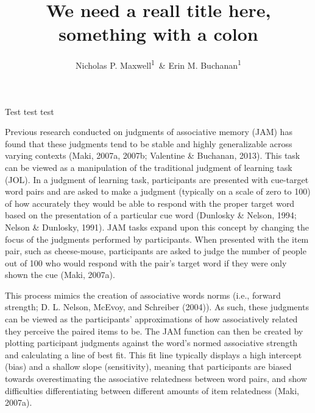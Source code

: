 \documentclass[english,man]{apa6}
\title{We need a reall title here, something with a colon}
\author{Nicholas P. Maxwell\textsuperscript{1}~\& Erin M. Buchanan\textsuperscript{1}}
\affiliation{
    \vspace{0.5cm}
          \textsuperscript{1} Missouri State University  }
\theoremstyle{definition}
\theoremstyle{definition}
\theoremstyle{definition}
\theoremstyle{remark}
\begin{document}
\maketitle

\setcounter{secnumdepth}{0}



Test test test

Previous research conducted on judgments of associative memory (JAM) has
found that these judgments tend to be stable and highly generalizable
across varying contexts (Maki, 2007a, 2007b; Valentine \& Buchanan,
2013). This task can be viewed as a manipulation of the traditional
judgment of learning task (JOL). In a judgment of learning task,
participants are presented with cue-target word pairs and are asked to
make a judgment (typically on a scale of zero to 100) of how accurately
they would be able to respond with the proper target word based on the
presentation of a particular cue word (Dunlosky \& Nelson, 1994; Nelson
\& Dunlosky, 1991). JAM tasks expand upon this concept by changing the
focus of the judgments performed by participants. When presented with
the item pair, such as cheese-mouse, participants are asked to judge the
number of people out of 100 who would respond with the pair's target
word if they were only shown the cue (Maki, 2007a).

This process mimics the creation of associative words norms (i.e.,
forward strength; D. L. Nelson, McEvoy, and Schreiber (2004)). As such,
these judgments can be viewed as the participants' approximations of how
associatively related they perceive the paired items to be. The JAM
function can then be created by plotting participant judgments against
the word's normed associative strength and calculating a line of best
fit. This fit line typically displays a high intercept (bias) and a
shallow slope (sensitivity), meaning that participants are biased
towards overestimating the associative relatedness between word pairs,
and show difficulties differentiating between different amounts of item
relatedness (Maki, 2007a).
\end{document}
